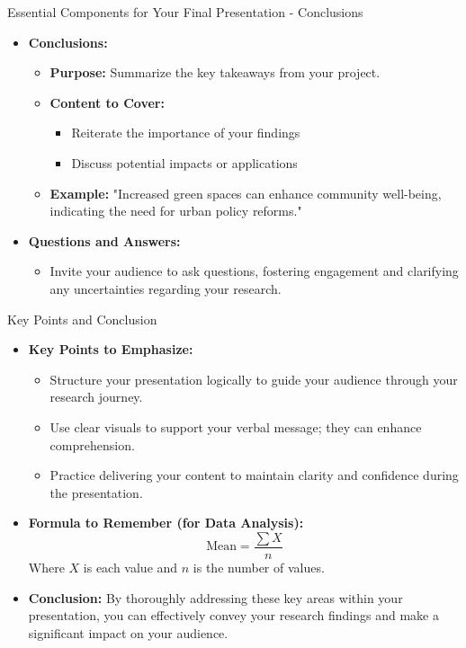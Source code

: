 \documentclass[aspectratio=169]{beamer}
\begin{document}
\begin{frame}[fragile]{Essential Components for Your Final Presentation - Conclusions}
    \begin{itemize}
        \item \textbf{Conclusions:}
        \begin{itemize}
            \item \textbf{Purpose:} Summarize the key takeaways from your project.
            \item \textbf{Content to Cover:}
            \begin{itemize}
                \item Reiterate the importance of your findings
                \item Discuss potential impacts or applications
            \end{itemize}
            \item \textbf{Example:} "Increased green spaces can enhance community well-being, indicating the need for urban policy reforms."
        \end{itemize}
        
        \item \textbf{Questions and Answers:}
        \begin{itemize}
            \item Invite your audience to ask questions, fostering engagement and clarifying any uncertainties regarding your research.
        \end{itemize}
    \end{itemize}
\end{frame}

\begin{frame}[fragile]{Key Points and Conclusion}
    \begin{itemize}
        \item \textbf{Key Points to Emphasize:}
        \begin{itemize}
            \item Structure your presentation logically to guide your audience through your research journey.
            \item Use clear visuals to support your verbal message; they can enhance comprehension.
            \item Practice delivering your content to maintain clarity and confidence during the presentation.
        \end{itemize}

        \item \textbf{Formula to Remember (for Data Analysis):}
        \begin{equation}
            \text{Mean} = \frac{\sum{X}}{n}
        \end{equation}
        Where \(X\) is each value and \(n\) is the number of values.

        \item \textbf{Conclusion:} By thoroughly addressing these key areas within your presentation, you can effectively convey your research findings and make a significant impact on your audience.
    \end{itemize}
\end{frame}
\end{document}
